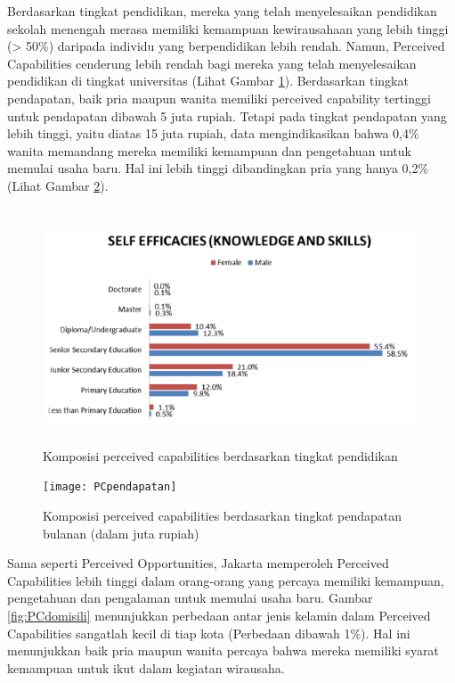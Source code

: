 Berdasarkan tingkat pendidikan, mereka yang telah menyelesaikan pendidikan sekolah menengah merasa memiliki kemampuan kewirausahaan yang lebih tinggi (> 50\%) daripada individu yang berpendidikan lebih rendah. Namun, Perceived Capabilities cenderung lebih rendah bagi mereka yang telah menyelesaikan pendidikan di tingkat universitas (Lihat Gambar \ref{fig:PCpendidikan}). Berdasarkan tingkat pendapatan, baik pria maupun wanita memiliki perceived capability tertinggi untuk pendapatan dibawah 5 juta rupiah. Tetapi pada tingkat pendapatan yang lebih tinggi, yaitu diatas 15 juta rupiah, data mengindikasikan bahwa 0,4\% wanita memandang mereka memiliki kemampuan dan pengetahuan untuk memulai usaha baru. Hal ini lebih tinggi dibandingkan pria yang hanya 0,2\% (Lihat Gambar \ref{fig:PCpendapatan}). 

\begin{figure} [H]
	\centering  
	\includegraphics[width=14cm, height=7cm]{PCpendidikan} 
	\caption[Komposisi perceived capabilities berdasarkan tingkat pendidikan]{Komposisi perceived capabilities berdasarkan tingkat pendidikan} 
	\label{fig:PCpendidikan} 
\end{figure}
 

\begin{figure} [ht]
	\centering  
	\texttt{[image: PCpendapatan]} 
	\caption[Komposisi perceived capabilities berdasarkan tingkat pendapatan bulanan (dalam juta rupiah)]{Komposisi perceived capabilities berdasarkan tingkat pendapatan bulanan (dalam juta rupiah)} 
	\label{fig:PCpendapatan} 
\end{figure}

Sama seperti Perceived Opportunities, Jakarta memperoleh Perceived Capabilities lebih tinggi dalam orang-orang yang percaya memiliki kemampuan, pengetahuan dan pengalaman untuk memulai usaha baru. Gambar \ref{fig:PCdomisili} menunjukkan perbedaan antar jenis kelamin dalam Perceived Capabilities sangatlah kecil di tiap kota (Perbedaan dibawah 1\%). Hal ini menunjukkan baik pria maupun wanita percaya bahwa mereka memiliki syarat kemampuan untuk ikut dalam kegiatan wirausaha.

